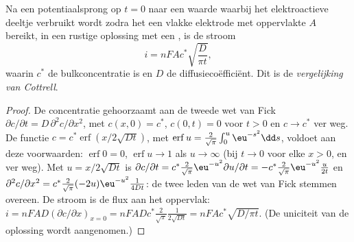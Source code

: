 \begin{theorem}\label{thm:b3:electrode-kinetics:cottrell}
Na een potentiaalsprong op $t = 0$ naar een waarde waarbij het
elektroactieve deeltje verbruikt wordt zodra het een vlakke elektrode met
oppervlakte $A$ bereikt, in een rustige oplossing met een , is
de stroom
\[
  i = nFAc^*\sqrt{\frac{D}{\pi t}},
\]
waarin $c^*$ de bulkconcentratie is en $D$ de diffusiecoëfficiënt. Dit is
de \emph{vergelijking van Cottrell}.
\end{theorem}

\begin{proof}
De concentratie gehoorzaamt aan de tweede wet van Fick $\partial c/\partial t = D\,\partial^2c/\partial x^2$, met $c(x, 0) = c^*$,
$c(0, t) = 0$ voor $t > 0$ en $c \to c^*$ ver weg. De functie $c = c^*\operatorname{erf}(x/2\sqrt{Dt})$, met
$\operatorname{erf}u = \frac{2}{\sqrt\pi}\int_0^u\eu^{-s^2}\dd s$, voldoet aan deze voorwaarden: $\operatorname{erf}0 = 0$, $\operatorname{erf}u \to 1$ als $u \to \infty$
(bij $t \to 0$ voor elke $x > 0$, en ver weg). Met $u = x/2\sqrt{Dt}$ is
$\partial c/\partial t = c^*\frac{2}{\sqrt\pi}\eu^{-u^2}\partial u/\partial t = -c^*\frac{2}{\sqrt\pi}\eu^{-u^2}\frac{u}{2t}$ en $\partial^2c/\partial x^2 = c^*\frac{2}{\sqrt\pi}(-2u)\eu^{-u^2}\frac{1}{4Dt}$: de
twee leden van de wet van Fick stemmen overeen. De stroom is de flux aan het oppervlak: $i =
nFAD(\partial c/\partial x)_{x = 0} = nFADc^*\frac{2}{\sqrt\pi}\frac{1}{2\sqrt{Dt}} = nFAc^*\sqrt{D/\pi t}$. (De
uniciteit van de oplossing wordt aangenomen.)
\end{proof}

